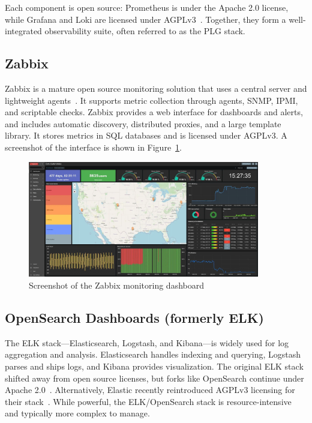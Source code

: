 Each component is open source: Prometheus is under the Apache 2.0 license, while Grafana and Loki are licensed under AGPLv3~\cite{grafana-license-change}. Together, they form a well-integrated observability suite, often referred to as the PLG stack.

\subsection*{Zabbix}
Zabbix is a mature open source monitoring solution that uses a central server and lightweight agents~\cite{zabbix-web}. It supports metric collection through agents, SNMP, IPMI, and scriptable checks. Zabbix provides a web interface for dashboards and alerts, and includes automatic discovery, distributed proxies, and a large template library. It stores metrics in SQL databases and is licensed under AGPLv3. A screenshot of the interface is shown in Figure~\ref{fig:zabbix-ui}.

\begin{figure}[H]
  \centering
  \includegraphics[width=0.9\textwidth]{imaxes/zabbix-ui.png}
  \caption{Screenshot of the Zabbix monitoring dashboard}
  \label{fig:zabbix-ui}
\end{figure}

\subsection*{OpenSearch Dashboards (formerly ELK)}
The ELK stack—Elasticsearch, Logstash, and Kibana—is widely used for log aggregation and analysis. Elasticsearch handles indexing and querying, Logstash parses and ships logs, and Kibana provides visualization. The original ELK stack shifted away from open source licenses, but forks like OpenSearch continue under Apache 2.0~\cite{opensearch-web}. Alternatively, Elastic recently reintroduced AGPLv3 licensing for their stack~\cite{elastic-license}. While powerful, the ELK/OpenSearch stack is resource-intensive and typically more complex to manage.

